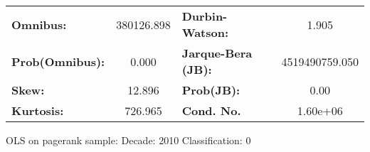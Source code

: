 \begin{center}
\begin{tabular}{lccccc}
\bottomrule
\end{tabular}
\begin{tabular}{lclc}
\textbf{Omnibus:}       & 380126.898 & \textbf{  Durbin-Watson:     } &       1.905     \\
\textbf{Prob(Omnibus):} &    0.000   & \textbf{  Jarque-Bera (JB):  } & 4519490759.050  \\
\textbf{Skew:}          &   12.896   & \textbf{  Prob(JB):          } &        0.00     \\
\textbf{Kurtosis:}      &  726.965   & \textbf{  Cond. No.          } &    1.60e+06     \\
\bottomrule
\end{tabular}
\end{center}
\break
OLS on pagerank sample: Decade: 2010 Classification: 0
